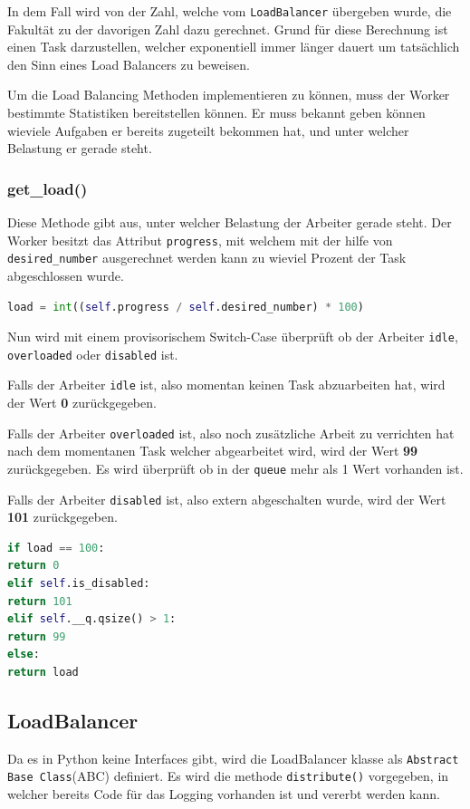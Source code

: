 In dem Fall wird von der Zahl, welche vom \verb|LoadBalancer| übergeben wurde, die Fakultät zu der davorigen Zahl dazu gerechnet. Grund für diese Berechnung ist einen Task darzustellen, welcher exponentiell immer länger dauert um tatsächlich den Sinn eines Load Balancers zu beweisen.

Um die Load Balancing Methoden implementieren zu können, muss der Worker bestimmte Statistiken bereitstellen können. Er muss bekannt geben können wieviele Aufgaben er bereits zugeteilt bekommen hat, und unter welcher Belastung er gerade steht. 

\subsubsection{get\_load()}
Diese Methode gibt aus, unter welcher Belastung der Arbeiter gerade steht. Der Worker besitzt das Attribut \verb|progress|, mit welchem mit der hilfe von \verb|desired_number| ausgerechnet werden kann zu wieviel Prozent der Task abgeschlossen wurde.

\begin{lstlisting}[language=python]
load = int((self.progress / self.desired_number) * 100)
\end{lstlisting}

Nun wird mit einem provisorischem Switch-Case überprüft ob der Arbeiter \verb|idle|, \verb|overloaded| oder \verb|disabled| ist. 

Falls der Arbeiter \verb|idle| ist, also momentan keinen Task abzuarbeiten hat, wird der Wert \textbf{0} zurückgegeben.

Falls der Arbeiter \verb|overloaded| ist, also noch zusätzliche Arbeit zu verrichten hat nach dem momentanen Task welcher abgearbeitet wird, wird der Wert \textbf{99} zurückgegeben. Es wird überprüft ob in der \verb|queue| mehr als 1 Wert vorhanden ist.

Falls der Arbeiter \verb|disabled| ist, also extern abgeschalten wurde, wird der Wert \textbf{101} zurückgegeben.


\begin{lstlisting}[language=python]
if load == 100:
return 0
elif self.is_disabled:
return 101
elif self.__q.qsize() > 1:
return 99
else:
return load
\end{lstlisting}
\subsection{LoadBalancer}
Da es in Python keine Interfaces gibt, wird die LoadBalancer klasse als \verb|Abstract Base Class|(ABC) definiert. Es wird die methode \verb|distribute()| vorgegeben, in welcher bereits Code für das Logging vorhanden ist und vererbt werden kann.

